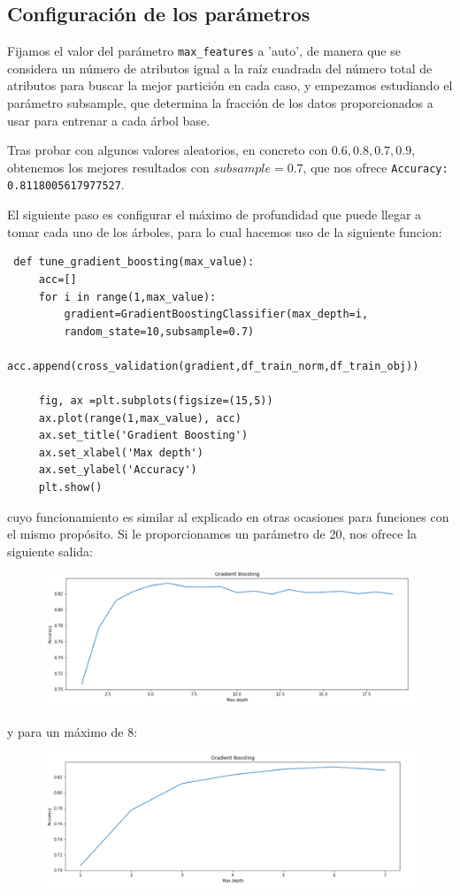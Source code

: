\documentclass[a4paper,11pt]{article}
\begin{document}
 \subsection{Configuración de los parámetros}
 Fijamos el valor del parámetro \texttt{max_features} a 'auto', de manera que se considera un número de atributos igual a la raíz cuadrada del número total de atributos para buscar la mejor partición en cada caso, y empezamos estudiando el parámetro subsample, que determina la fracción de los datos proporcionados a usar para entrenar a cada árbol base. 
 
 Tras probar con algunos valores aleatorios, en concreto con $0.6,0.8,0.7,0.9$, obtenemos los mejores resultados con $subsample=0.7$, que nos ofrece \texttt{Accuracy:  0.8118005617977527}. 
 
 El siguiente paso es configurar el máximo de profundidad que puede llegar a tomar cada uno de los árboles, para lo cual hacemos uso de la siguiente funcion:
 \begin{verbatim}
 def tune_gradient_boosting(max_value):
	 acc=[]
	 for i in range(1,max_value):
		 gradient=GradientBoostingClassifier(max_depth=i,
		 random_state=10,subsample=0.7)
		 acc.append(cross_validation(gradient,df_train_norm,df_train_obj))
	 
	 fig, ax =plt.subplots(figsize=(15,5))
	 ax.plot(range(1,max_value), acc)
	 ax.set_title('Gradient Boosting')
	 ax.set_xlabel('Max depth')
	 ax.set_ylabel('Accuracy')
	 plt.show()
 \end{verbatim}
 cuyo funcionamiento es similar al explicado en otras ocasiones para funciones con el mismo propósito. Si le proporcionamos un parámetro de 20, nos ofrece la siguiente salida: 
 \begin{figure}[H]
 	\centering
 	\includegraphics[width=0.7\linewidth]{img/gradient1}
 	\caption{}
 	\label{fig:gradient1}
 \end{figure}
 
 y para un máximo de 8:
 \begin{figure}[H]
 	\centering
 	\includegraphics[width=0.7\linewidth]{img/gradient2}
 	\caption{}
 	\label{fig:gradient2}
 \end{figure}
 
\end{document}
